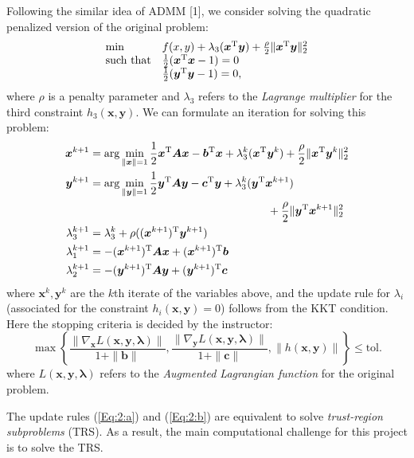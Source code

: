 Following the similar idea of ADMM [1], we consider solving the quadratic penalized version of the original problem:
\begin{equation}
\begin{array}{ll}
\min&f(x,y)+\lambda_3(\bm x^{\mathrm T}\bm y)+\frac{\rho}{2}\|\bm x^{\mathrm T}\bm y\|_2^2
\\
\mbox{such that}&\frac{1}{2}(\bm x^{\mathrm T}\bm x-1)=0\\
&\frac{1}{2}(\bm y^{\mathrm T}\bm y-1)=0,
\end{array}
\end{equation}
where $\rho$ is a penalty parameter and $\lambda_3$ refers to the \emph{Lagrange multiplier} for the third constraint $h_3(\bm x,\bm y)$. We can formulate an iteration for solving this problem:
\begin{subequations}
\begin{align}
\bm x^{k+1}&=\arg\min_{\|\bm x\|=1}\frac{1}{2}\bm x^{\mathrm T}\bm A\bm x-\bm b^{\mathrm T}\bm x+\lambda_3^k(\bm x^{\mathrm T}\bm y^k)+\frac{\rho}{2}\|\bm x^{\mathrm T}\bm y^k\|_2^2\label{Eq:2:a}\\
\bm y^{k+1}&=
\arg\min_{\|\bm y\|=1}\frac{1}{2}\bm y^{\mathrm T}\bm A\bm y-\bm c^{\mathrm T}\bm y+\lambda_3^k(\bm y^{\mathrm T}\bm x^{k+1})\label{Eq:2:b}\\
&\qquad\qquad\qquad\qquad\qquad\qquad\qquad\qquad+\frac{\rho}{2}\|\bm y^{\mathrm T}\bm x^{k+1}\|_2^2\nonumber\\
\lambda_3^{k+1}&=\lambda_3^k+\rho((\bm x^{k+1})^{\mathrm T}\bm y^{k+1})\label{Eq:2:c}\\
\lambda_1^{k+1}&=-(\bm x^{k+1})^{\mathrm T}\bm A\bm x+(\bm x^{k+1})^{\mathrm T}\bm b\nonumber\\
\lambda_2^{k+1}&=-(\bm y^{k+1})^{\mathrm T}\bm A\bm y+(\bm y^{k+1})^{\mathrm T}\bm c\nonumber
\end{align}
\end{subequations}
where $\bm x^k,\bm y^k$ are the $k$th iterate of the variables above, and the update rule for $\lambda_i$ (associated for the constraint $h_i(\bm x,\bm y)=0$) follows from the KKT condition. Here the stopping criteria is decided by the instructor:
\[
\max\left\{
\frac{\|\nabla_{\bm x}L(\bm x,\bm y,\bm\lambda)\|}{1+\|\bm b\|},
\frac{\|\nabla_{\bm y}L(\bm x,\bm y,\bm\lambda)\|}{1+\|\bm c\|},
\|h(\bm x,\bm y)\|
\right\}\le\mbox{tol}.
\]
where $L(\bm x,\bm y,\bm\lambda)$ refers to the \emph{Augmented Lagrangian function} for the original problem.

The update rules (\ref{Eq:2:a}) and (\ref{Eq:2:b}) are equivalent to solve \emph{trust-region subproblems} (TRS). As a result, the main computational challenge for this project is to solve the TRS.

